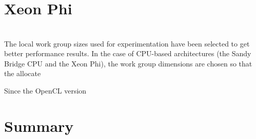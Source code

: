 \section{Xeon Phi}





\section{}

The local work group sizes used for experimentation have been selected to get better performance results. In the case of CPU-based architectures (the Sandy Bridge CPU and the Xeon Phi), the work group dimensions are chosen so that the allocate



Since the OpenCL version 





\section{}







\section{Summary}

